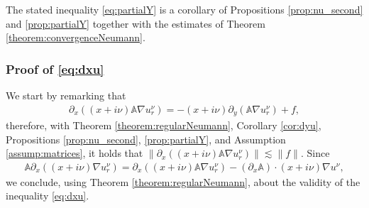 \documentclass[report]{elsarticle}
\numberwithin{theorem}{section}
\renewcommand{\vec}[1]{\mathbf{#1}}
\begin{document}
The stated inequality \eqref{eq:partialY} is a corollary of Propositions \ref{prop:nu_second} and \ref{prop:partialY} together with the estimates of Theorem \ref{theorem:convergenceNeumann}.  
%
%
%
\subsubsection{Proof of \eqref{eq:dxu}}
We start by remarking that 
\begin{align*}
	\partial_x((x+i\nu)\mathbb{A}\nabla u^{\nu}_r)=-(x+i\nu)\partial_y(\mathbb{A}\nabla u^{\nu}_r)+f, 
\end{align*}
therefore, with Theorem \ref{theorem:regularNeumann}, Corollary \ref{cor:dyu}, Propositions \ref{prop:nu_second}, \ref{prop:partialY}, and Assumption \ref{assump:matrices}, it holds that $\|\partial_x((x+i\nu)\mathbb{A}\nabla u^{\nu}_r)\|\lesssim \|f\|$. Since
\begin{align*}
\mathbb{A}\partial_x((x+i\nu)\nabla u^{\nu}_r)=	\partial_x((x+i\nu)\mathbb{A}\nabla u^{\nu}_r)-(\partial_x\mathbb{A})\cdot(x+i\nu)\nabla u^{\nu},
\end{align*}
we conclude, using Theorem \ref{theorem:regularNeumann}, about the validity of the inequality \eqref{eq:dxu}. 
\end{document}
